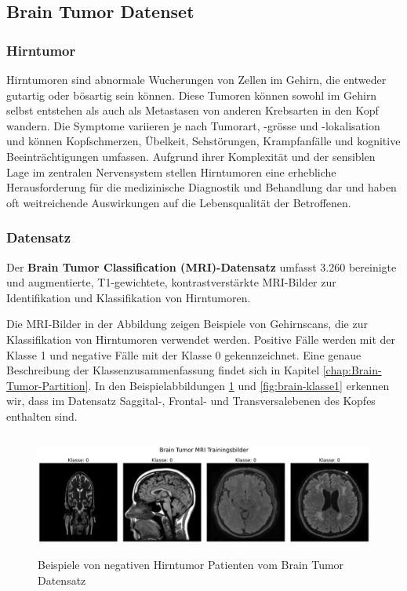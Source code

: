 \subsection{Brain Tumor Datenset} \label{chap:Brain-Tumor}

\subsubsection{Hirntumor} \label{chap:Hirntumor}
Hirntumoren sind abnormale Wucherungen von Zellen im Gehirn, die entweder gutartig oder bösartig sein können. Diese Tumoren können sowohl im Gehirn selbst entstehen als auch als Metastasen von anderen Krebsarten in den Kopf wandern. Die Symptome variieren je nach Tumorart, -grösse und -lokalisation und können Kopfschmerzen, Übelkeit, Sehstörungen, Krampfanfälle und kognitive Beeinträchtigungen umfassen. Aufgrund ihrer Komplexität und der sensiblen Lage im zentralen Nervensystem stellen Hirntumoren eine erhebliche Herausforderung für die medizinische Diagnostik und Behandlung dar und haben oft weitreichende Auswirkungen auf die Lebensqualität der Betroffenen. 


\subsubsection{Datensatz}
Der \textbf{Brain Tumor Classification (MRI)-Datensatz} \cite{bhuvaji_brain_2020} umfasst 3.260 bereinigte und augmentierte, T1-gewichtete, kontrastverstärkte MRI-Bilder zur Identifikation und Klassifikation von Hirntumoren. 

Die MRI-Bilder in der Abbildung zeigen Beispiele von Gehirnscans, die zur Klassifikation von Hirntumoren verwendet werden. Positive Fälle werden mit der Klasse 1 und negative Fälle mit der Klasse 0 gekennzeichnet. Eine genaue Beschreibung der Klassenzusammenfassung findet sich in Kapitel \ref{chap:Brain-Tumor-Partition}. In den Beispielabbildungen \ref{fig:brain-klasse0} und \ref{fig:brain-klasse1} erkennen wir, dass im Datensatz Saggital-, Frontal- und Transversalebenen des Kopfes enthalten sind.

\begin{figure}[ht]
    \centering
    \includegraphics[width=\linewidth, height=4cm]{01-images/03-data/brain-klasse0.png}
    \caption{Beispiele von negativen Hirntumor Patienten vom Brain Tumor Datensatz}
    \label{fig:brain-klasse0}
\end{figure}

